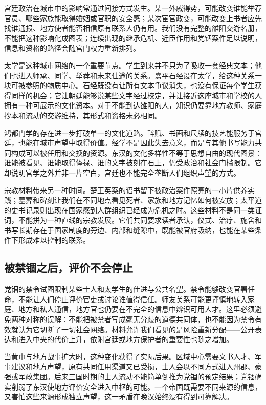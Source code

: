 宫廷政治在城市中的影响常通过间接方式发生。某一外戚得势，可能改变谁能举荐官员、哪些家族能取得婚姻或官职的安全感；某次宦官政变，可能改变上书者应先找谁通报、地方使者能否相信原有联系人仍有用。我们没有完整的雒阳交游名册，不能把这种影响化成图表；连续出现的继承危机、近臣作用和党锢案件足以说明，信息和资格的路径会随宫门权力重新排列。

太学是这种城市网络的一个重要节点。学生到来并不只为了吸收一套经典文本；他们也进入师承、同学、举荐和未来仕途的关系。熹平石经设在太学，给这种关系一块可被参照的物质中心。石经既没有让所有文本争议消失，也没有保证每个学生获得同样的机会；它让朝廷能够说某些文字经过校定，并让接近这座城市和学校的人拥有一种可展示的文化资本。对于不能到达雒阳的人，知识仍要靠地方教师、家庭抄本和流动的交游维持，其形式和资格未必相同。

鸿都门学的存在进一步打破单一的文化道路。辞赋、书画和尺牍的技艺能服务于宫廷，也能在城市声望中取得价值。经学不是因此失去意义，而是与其他书写能力共同构成可以被任用和交换的资源。东汉的文化多样性不等于思想自由的现代图景：谁能被看见、谁能取得俸禄、谁的文字被刻在石上，仍受政治和社会门槛限制。它却说明官学之外并非一片空白，宫廷也不能完全垄断人们组织声望的方式。

宗教材料带来另一种时间。楚王英案的诏书留下被政治案件照亮的一小片供养实践；墓葬和碑刻让我们在不同地点看见死者、家族和地方记忆如何被安放；太平道的史书记录则出现在国家感到人群组织已经成为危机之时。这些材料不是同一类证词，不能拼为一种直线的宗教发展。它们共同要求读者承认，仪式、治疗、施舍和书写长期存在于国家制度的旁边、内部和缝隙中，既能被官府吸纳，也能在某些条件下形成难以控制的联系。

\subsection{被禁锢之后，评价不会停止}

党锢的禁令试图限制某些士人和太学生的仕进与公共名望。禁令能够改变官署任命，不能让人们停止评价官吏或讨论谁值得信任。师友关系可能更谨慎地转入家庭、地方和私人通信，地方官也仍要在不完全的信息中辨识可用人才。这里必须避免两种对称的误解：不能把被禁者写成毫无分歧的道德共同体，也不能因为禁令有效就认为它切断了一切社会网络。材料允许我们看见的是风险重新分配——公开表达和进入中央的代价上升，依附宫廷或地方保护者的重要性也随之增加。

当黄巾与地方战事扩大时，这种变化获得了实际后果。区域中心需要文书人才、军事建议和地方声望，原有共同任用渠道又已受损，士人会以不同方式进入州郡、豪强或军政集团。后来三国时期的士人流动不能简单倒推为党锢的预定结果；党锢确实削弱了东汉使地方评价安全进入中枢的可能。一个帝国既需要不同来源的信息，又害怕这些来源形成独立声望，这一矛盾在晚汉始终没有得到可靠解决。

